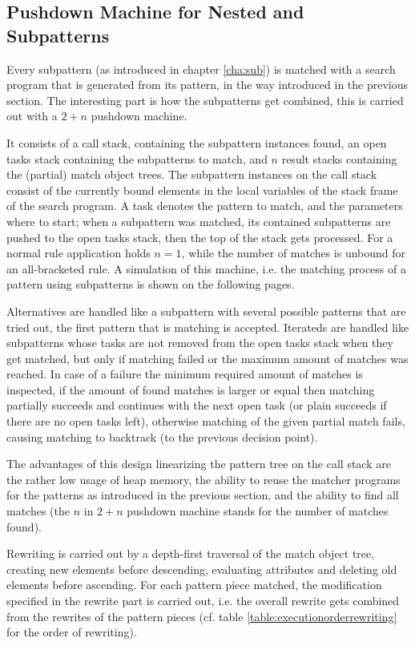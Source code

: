 \subsection*{Pushdown Machine for Nested and Subpatterns}\label{pushdownmachine}
Every subpattern (as introduced in chapter \ref{cha:sub}) is matched with a search program that is generated from its pattern, in the way introduced in the previous section. 
The interesting part is how the subpatterns get combined, this is carried out with a $2+n$ pushdown machine.

It consists of a call stack, containing the subpattern instances found, an open tasks stack containing the subpatterns to match, and $n$ result stacks containing the (partial) match object trees.
The subpattern instances on the call stack consist of the currently bound elements in the local variables of the stack frame of the search program.
A task denotes the pattern to match, and the parameters where to start; when a subpattern was matched, its contained subpatterns are pushed to the open tasks stack, then the top of the stack gets processed.
For a normal rule application holds $n=1$, while the number of matches is unbound for an all-bracketed rule.
A simulation of this machine, i.e. the matching process of a pattern using subpatterns is shown on the following pages.

Alternatives are handled like a subpattern with several possible patterns that are tried out, the first pattern that is matching is accepted.
Iterateds are handled like subpatterns whose tasks are not removed from the open tasks stack when they get matched, but only if matching failed or the maximum amount of matches was reached.
In case of a failure the minimum required amount of matches is inspected, if the amount of found matches is larger or equal then matching partially succeeds and continues with the next open task (or plain succeeds if there are no open tasks left), otherwise matching of the given partial match fails, causing matching to backtrack (to the previous decision point).

The advantages of this design linearizing the pattern tree on the call stack are the rather low usage of heap memory, the ability to reuse the matcher programs for the patterns as introduced in the previous section, and the ability to find all matches (the $n$ in $2+n$ pushdown machine stands for the number of matches found).

Rewriting is carried out by a depth-first traversal of the match object tree, creating new elements before descending, evaluating attributes and deleting old elements before ascending. 
For each pattern piece matched, the modification specified in the rewrite part is carried out, i.e. the overall rewrite gets combined from the rewrites of the pattern pieces (cf. table \ref{table:executionorderrewriting} for the order of rewriting).

